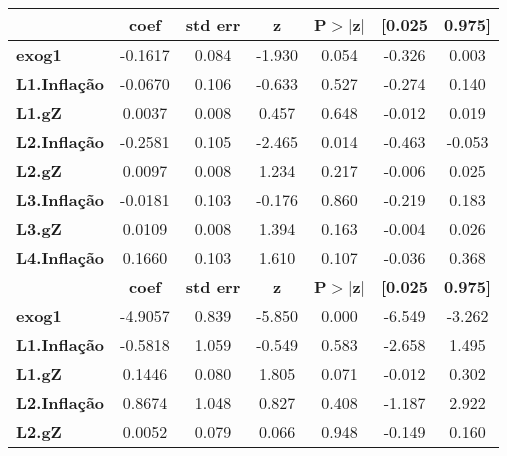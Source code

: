 \begin{center}
\begin{tabular}{lcccccc}
\toprule
                     & \textbf{coef} & \textbf{std err} & \textbf{z} & \textbf{P$> |$z$|$} & \textbf{[0.025} & \textbf{0.975]}  \\
\midrule
\textbf{exog1}       &      -0.1617  &        0.084     &    -1.930  &         0.054        &       -0.326    &        0.003     \\
\textbf{L1.Inflação} &      -0.0670  &        0.106     &    -0.633  &         0.527        &       -0.274    &        0.140     \\
\textbf{L1.gZ}       &       0.0037  &        0.008     &     0.457  &         0.648        &       -0.012    &        0.019     \\
\textbf{L2.Inflação} &      -0.2581  &        0.105     &    -2.465  &         0.014        &       -0.463    &       -0.053     \\
\textbf{L2.gZ}       &       0.0097  &        0.008     &     1.234  &         0.217        &       -0.006    &        0.025     \\
\textbf{L3.Inflação} &      -0.0181  &        0.103     &    -0.176  &         0.860        &       -0.219    &        0.183     \\
\textbf{L3.gZ}       &       0.0109  &        0.008     &     1.394  &         0.163        &       -0.004    &        0.026     \\
\textbf{L4.Inflação} &       0.1660  &        0.103     &     1.610  &         0.107        &       -0.036    &        0.368     \\
                     & \textbf{coef} & \textbf{std err} & \textbf{z} & \textbf{P$> |$z$|$} & \textbf{[0.025} & \textbf{0.975]}  \\
\midrule
\textbf{exog1}       &      -4.9057  &        0.839     &    -5.850  &         0.000        &       -6.549    &       -3.262     \\
\textbf{L1.Inflação} &      -0.5818  &        1.059     &    -0.549  &         0.583        &       -2.658    &        1.495     \\
\textbf{L1.gZ}       &       0.1446  &        0.080     &     1.805  &         0.071        &       -0.012    &        0.302     \\
\textbf{L2.Inflação} &       0.8674  &        1.048     &     0.827  &         0.408        &       -1.187    &        2.922     \\
\textbf{L2.gZ}       &       0.0052  &        0.079     &     0.066  &         0.948        &       -0.149    &        0.160     \\

\end{tabular}
\end{center}
